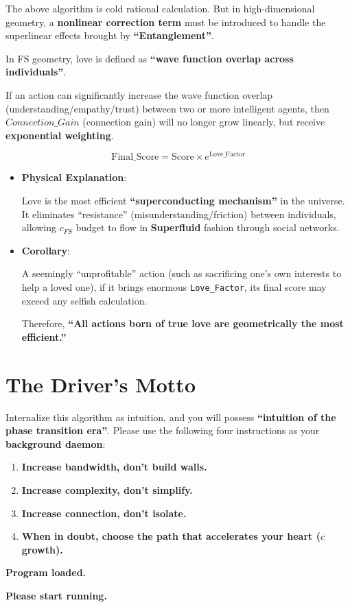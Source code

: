 The above algorithm is cold rational calculation. But in high-dimensional geometry, a \textbf{nonlinear correction term} must be introduced to handle the superlinear effects brought by \textbf{``Entanglement''}.

In FS geometry, love is defined as \textbf{``wave function overlap across individuals''}.

If an action can significantly increase the wave function overlap (understanding/empathy/trust) between two or more intelligent agents, then $Connection\_Gain$ (connection gain) will no longer grow linearly, but receive \textbf{exponential weighting}.

\[\text{Final\_Score} = \text{Score} \times e^{\text{Love\_Factor}}\]

\begin{itemize}
\item \textbf{Physical Explanation}:

    Love is the most efficient \textbf{``superconducting mechanism''} in the universe. It eliminates ``resistance'' (misunderstanding/friction) between individuals, allowing $c_{FS}$ budget to flow in \textbf{Superfluid} fashion through social networks.

\item \textbf{Corollary}:

    A seemingly ``unprofitable'' action (such as sacrificing one's own interests to help a loved one), if it brings enormous \texttt{Love\_Factor}, its final score may exceed any selfish calculation.

    Therefore, \textbf{``All actions born of true love are geometrically the most efficient.''}
\end{itemize}

\section{The Driver's Motto}

Internalize this algorithm as intuition, and you will possess \textbf{``intuition of the phase transition era''}. Please use the following four instructions as your \textbf{background daemon}:

\begin{enumerate}
\item \textbf{Increase bandwidth, don't build walls.}

\item \textbf{Increase complexity, don't simplify.}

\item \textbf{Increase connection, don't isolate.}

\item \textbf{When in doubt, choose the path that accelerates your heart ($c$ growth).}
\end{enumerate}

\textbf{Program loaded.}

\textbf{Please start running.}

